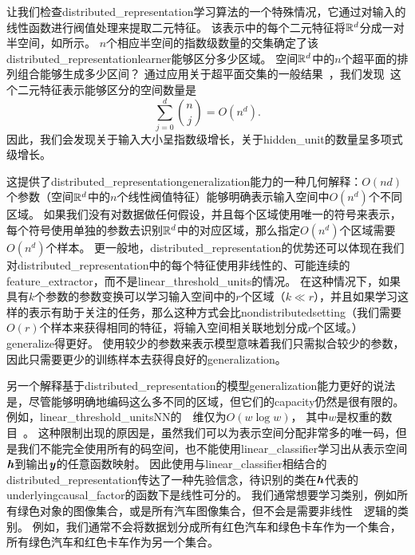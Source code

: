 
让我们检查\gls{distributed_representation}学习算法的一个特殊情况，它通过对输入的线性函数进行阀值处理来提取二元特征。
该表示中的每个二元特征将$\mathbb{R}^d$分成一对半空间，如所示。
$n$个相应半空间的指数级数量的交集确定了该\gls{distributed_representation}\gls{learner}能够区分多少区域。
空间$\mathbb{R}^d$中的$n$个超平面的排列组合能够生成多少区间？
通过应用关于超平面交集的一般结果~\citep{Zaslavsky-1975}，我们发现~\citep{Pascanu+et+al-ICLR2014b}这个二元特征表示能够区分的空间数量是
\begin{equation}
	\sum_{j=0}^d \binom{n}{j} = O(n^d).
\end{equation}
因此，我们会发现关于输入大小呈指数级增长，关于\gls{hidden_unit}的数量呈多项式级增长。


这提供了\gls{distributed_representation}\gls{generalization}能力的一种几何解释：$O(nd)$个参数（空间$\mathbb{R}^d$中的$n$个线性阀值特征）能够明确表示输入空间中$O(n^d)$个不同区域。
如果我们没有对数据做任何假设，并且每个区域使用唯一的符号来表示，每个符号使用单独的参数去识别$\mathbb{R}^d$中的对应区域，那么指定$O(n^d)$个区域需要$O(n^d)$个样本。
更一般地，\gls{distributed_representation}的优势还可以体现在我们对\gls{distributed_representation}中的每个特征使用非线性的、可能连续的\gls{feature_extractor}，而不是\gls{linear_threshold_units}的情况。
在这种情况下，如果具有$k$个参数的参数变换可以学习输入空间中的$r$个区域（$k\ll r$），并且如果学习这样的表示有助于关注的任务，那么这种方式会比\gls{nondistributed}\gls{setting}（我们需要$O(r)$个样本来获得相同的特征，将输入空间相关联地划分成$r$个区域。）\gls{generalize}得更好。
使用较少的参数来表示模型意味着我们只需拟合较少的参数，因此只需要更少的训练样本去获得良好的\gls{generalization}。


另一个解释基于\gls{distributed_representation}的模型\gls{generalization}能力更好的说法是，尽管能够明确地编码这么多不同的区域，但它们的\gls{capacity}仍然是很有限的。
例如，\gls{linear_threshold_units}\gls{NN}的~~维仅为$O(w\log w)$， 其中$w$是权重的数目~\citep{sontag1998vc}。
这种限制出现的原因是，虽然我们可以为表示空间分配非常多的唯一码，但是我们不能完全使用所有的码空间，也不能使用\gls{linear_classifier}学习出从表示空间$\boldsymbol{\mathit{h}}$到输出$\boldsymbol{\mathit{y}}$的任意函数映射。
因此使用与\gls{linear_classifier}相结合的\gls{distributed_representation}传达了一种先验信念，待识别的类在$\boldsymbol{\mathit{h}}$代表的\gls{underlying}\gls{causal_factor}的函数下是线性可分的。
我们通常想要学习类别，例如所有绿色对象的图像集合，或是所有汽车图像集合，但不会是需要非线性~~逻辑的类别。
例如，我们通常不会将数据划分成所有红色汽车和绿色卡车作为一个集合，所有绿色汽车和红色卡车作为另一个集合。

